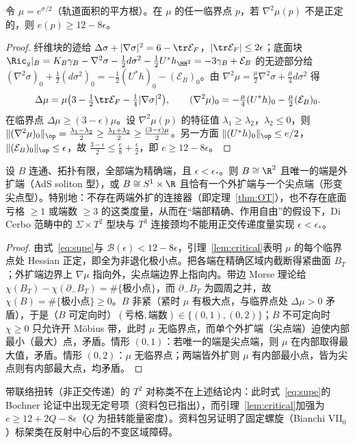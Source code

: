 \begin{lemma}[临界点引理]\label{lem:critical}
令 $\mu=e^{\sigma/2}$（轨道面积的平方根）。在 $\mu$ 的任一临界点 $p$，若 $\nabla^2\mu(p)$ 不是正定的，则 $e(p)\ge12-8\epsilon$。
\end{lemma}
\begin{proof}
纤维块的迹给 $\Delta\sigma+|\nabla\sigma|^2=6-\tr\mathcal E_F$，$|\tr\mathcal E_F|\le2\epsilon$；底面块 $\Ric_g|_B=K_B\gamma_B-\nabla^2\sigma-\frac12d\sigma^2-\frac12U^*h_{\HH^2}=-3\gamma_B+\mathcal E_B$ 的无迹部分给 $(\nabla^2\sigma)_0+\frac12(d\sigma^2)_0=-\frac12(U^*h)_0-(\mathcal E_B)_0$。由 $\nabla^2\mu=\frac\mu2\nabla^2\sigma+\frac\mu4d\sigma^2$ 得
\[
\Delta\mu=\mu\bigl(3-\tfrac12\tr\mathcal E_F-\tfrac14|\nabla\sigma|^2\bigr),\qquad(\nabla^2\mu)_0=-\tfrac\mu4(U^*h)_0-\tfrac\mu2(\mathcal E_B)_0 .
\]
在临界点 $\Delta\mu\ge(3-\epsilon)\mu$。设 $\nabla^2\mu(p)$ 的特征值 $\lambda_1\ge\lambda_2$，$\lambda_2\le0$，则 $\|(\nabla^2\mu)_0\|_{\op}=\frac{\lambda_1-\lambda_2}2\ge\frac{\lambda_1+\lambda_2}2\ge\frac{(3-\epsilon)\mu}2$。另一方面 $\|(U^*h)_0\|_{\op}\le e/2$，$\|(\mathcal E_B)_0\|_{\op}\le\epsilon$，故 $\frac{3-\epsilon}2\le\frac e8+\frac\epsilon2$，即 $e\ge12-8\epsilon$。
\end{proof}

\begin{proposition}[正交传递类的底面分类]\label{prop:morse}
设 $B$ 连通、拓扑有限，全部端为精确端，且 $\epsilon<\epsilon_*$。则 $B\cong\R^2$ 且唯一的端是外扩端（AdS soliton 型），或 $B\cong S^1\times\R$ 且恰有一个外扩端与一个尖点端（形变尖点型）。特别地：不存在两端外扩的连接器（即定理~\ref{thm:OT}），也不存在底面亏格 $\ge1$ 或端数 $\ge3$ 的这类度量，从而在“端部精确、作用自由”的假设下，Di Cerbo 范畴中的 $\Sigma\times T^2$ 型块与 $T^3$ 连接颈均不能用正交传递度量实现 $\epsilon<\epsilon_*$。
\end{proposition}
\begin{proof}
由式~\eqref{eq:supe}与 $\mathcal B(\epsilon)<12-8\epsilon$，引理~\ref{lem:critical}表明 $\mu$ 的每个临界点处 Hessian 正定，即全为非退化极小点。把各端在精确区域内截断得紧曲面 $B_T$；外扩端边界上 $\nabla\mu$ 指向外，尖点端边界上指向内。带边 Morse 理论给 $\chi(B_T)-\chi(\partial_-B_T)=\#\{\text{极小点}\}$，而 $\partial_-B_T$ 为圆周之并，故 $\chi(B)=\#\{\text{极小点}\}\ge0$。$B$ 非紧（紧时 $\mu$ 有极大点，与临界点处 $\Delta\mu>0$ 矛盾），于是（$B$ 可定向时）$(\text{亏格},\text{端数})\in\{(0,1),(0,2)\}$；$B$ 不可定向时 $\chi\ge0$ 只允许开 Möbius 带，此时 $\mu$ 无临界点，而单个外扩端（尖点端）迫使内部最小（最大）点，矛盾。情形 $(0,1)$：若唯一的端是尖点端，则 $\mu$ 在内部取得最大值，矛盾。情形 $(0,2)$：$\mu$ 无临界点；两端皆外扩则 $\mu$ 有内部最小点，皆为尖点则有内部最大点，均矛盾。
\end{proof}

带联络扭转（非正交传递）的 $T^2$ 对称类不在上述结论内：此时式~\eqref{eq:supe}的 Bochner 论证中出现无定号项（资料包已指出），而引理~\ref{lem:critical}加强为 $e\ge12+2Q-8\epsilon$（$Q$ 为扭转能量密度）。资料包另证明了固定螺旋（Bianchi VII$_0$）标架类在反射中心后的不变区域障碍。
